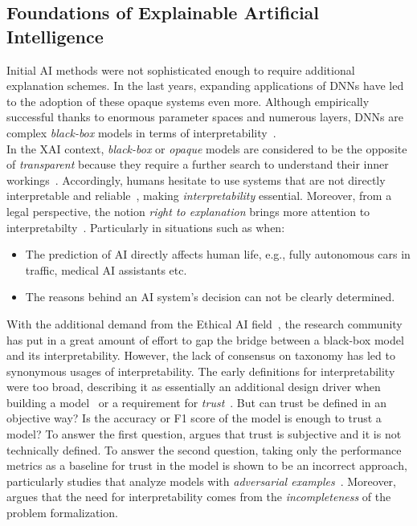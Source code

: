 \subsection{Foundations of Explainable Artificial Intelligence}
\label{subsec:explainableArtificialIntelligence_Foundations}
Initial AI methods were not sophisticated enough to require additional explanation schemes. In the last years, expanding applications of DNNs have led to the adoption of these opaque systems even more. Although empirically successful thanks to enormous parameter spaces and numerous layers, DNNs are complex \emph{black-box} models in terms of  interpretability~\parencite{CanWeOpenTheBlackBoxOfAI_Castelvecchi}.\\
In the XAI context, \emph{black-box} or \emph{opaque} models are considered to be the opposite of \emph{transparent} because they require a further search to understand their inner workings~\parencite{TheMythosOfModelInterpretability_Lipton}. Accordingly, humans hesitate to use
systems that are not directly interpretable and reliable~\parencite{xAIForDesigners_Zhu}, making \emph{interpretability} essential. Moreover, from a legal perspective, the notion \emph{right to explanation} brings more attention to interpretabilty~\parencite{TheMythosOfModelInterpretability_Lipton}. Particularly in situations such as when:
\begin{itemize}
    \item The prediction of AI directly affects human life, e.g., fully autonomous cars in traffic, medical AI assistants etc.
    \item The reasons behind an AI system’s decision can not be clearly determined.
\end{itemize}
With the additional demand from the Ethical AI field~\parencite{EURegulationsOnDecisionMaking_Goodman}, the research community has put in a great amount of effort to gap the bridge between a black-box model and its interpretability. However, the lack of consensus on taxonomy has led to synonymous usages of interpretability. The early definitions for interpretability were too broad, describing it as essentially an additional design driver when building a model~\parencite{TheBayesianCaseModel_Kim} or a requirement for \emph{trust}~\parencite{InteractiveAndInterpretableMLModels_Kim}. But can trust be defined in an objective way? Is the accuracy or F1 score of the model is enough to trust a model? To answer the first question, \cite{TheMythosOfModelInterpretability_Lipton} argues that trust is subjective and it is not technically defined. To answer the second question, taking only the performance metrics as a baseline for trust in the model is shown to be an incorrect approach, particularly studies that analyze models with \emph{adversarial examples}~\parencite{DetectingAdversarilaImageExamples_Bin, AdversarialExamples_Yuan}. Moreover, ~\cite{TowardsARigorousScienceML_Velez} argues that the need for interpretability comes from the \emph{incompleteness} of the problem formalization.\\
